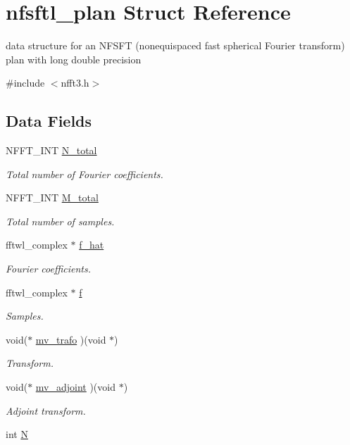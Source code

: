 \hypertarget{structnfsftl__plan}{\section{nfsftl\-\_\-plan Struct Reference}
\label{structnfsftl__plan}
}


data structure for an N\-F\-S\-F\-T (nonequispaced fast spherical Fourier transform) plan with long double precision  




{\ttfamily \#include $<$nfft3.\-h$>$}

\subsection*{Data Fields}
\begin{DoxyCompactItemize}
\item 
N\-F\-F\-T\-\_\-\-I\-N\-T \hyperlink{structnfsftl__plan_a1bfa1de211ea27da5675678e363ff1ab}{N\-\_\-total}
\begin{DoxyCompactList}\small\item\em Total number of Fourier coefficients. \end{DoxyCompactList}\item 
N\-F\-F\-T\-\_\-\-I\-N\-T \hyperlink{structnfsftl__plan_adae433d8abf67e89b1aa194db96b1ff8}{M\-\_\-total}
\begin{DoxyCompactList}\small\item\em Total number of samples. \end{DoxyCompactList}\item 
fftwl\-\_\-complex $\ast$ \hyperlink{structnfsftl__plan_ab9243951baccdf59de326cada1c08853}{f\-\_\-hat}
\begin{DoxyCompactList}\small\item\em Fourier coefficients. \end{DoxyCompactList}\item 
fftwl\-\_\-complex $\ast$ \hyperlink{structnfsftl__plan_ad27b30233039fea75a9e1bc885324f3d}{f}
\begin{DoxyCompactList}\small\item\em Samples. \end{DoxyCompactList}\item 
void($\ast$ \hyperlink{structnfsftl__plan_ab1a7dae6c0f2b18d4eda2e32195bba95}{mv\-\_\-trafo} )(void $\ast$)
\begin{DoxyCompactList}\small\item\em Transform. \end{DoxyCompactList}\item 
void($\ast$ \hyperlink{structnfsftl__plan_a162601fc8aa3248af806908e160d3c14}{mv\-\_\-adjoint} )(void $\ast$)
\begin{DoxyCompactList}\small\item\em Adjoint transform. \end{DoxyCompactList}\item 
\hypertarget{structnfsftl__plan_a8740f26f76947fcc07a636002217a8db}{int \hyperlink{structnfsftl__plan_a8740f26f76947fcc07a636002217a8db}{N}}\label{structnfsftl__plan_a8740f26f76947fcc07a636002217a8db}


\end{DoxyCompactItemize}
